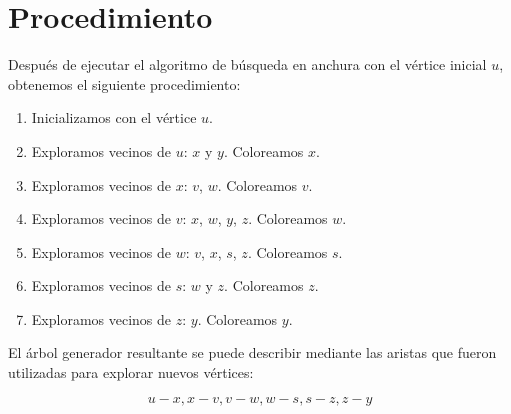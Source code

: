 \documentclass{article}
\begin{document}
\section{Procedimiento}

Después de ejecutar el algoritmo de búsqueda en anchura con el vértice inicial \( u \), obtenemos el siguiente procedimiento:

\begin{enumerate}
    \item Inicializamos con el vértice \( u \).
    \item Exploramos vecinos de \( u \): \( x \) y \( y \). Coloreamos \( x \).
    \item Exploramos vecinos de \( x \): \( v \), \( w \). Coloreamos \( v \).
    \item Exploramos vecinos de \( v \): \( x \), \( w \), \( y \), \( z \). Coloreamos \( w \).
    \item Exploramos vecinos de \( w \): \( v \), \( x \), \( s \), \( z \). Coloreamos \( s \).
    \item Exploramos vecinos de \( s \): \( w \) y \( z \). Coloreamos \( z \).
    \item Exploramos vecinos de \( z \): \( y \). Coloreamos \( y \).
\end{enumerate}

El árbol generador resultante se puede describir mediante las aristas que fueron utilizadas para explorar nuevos vértices:

\[ u-x, x-v, v-w, w-s, s-z, z-y \]
\end{document}
